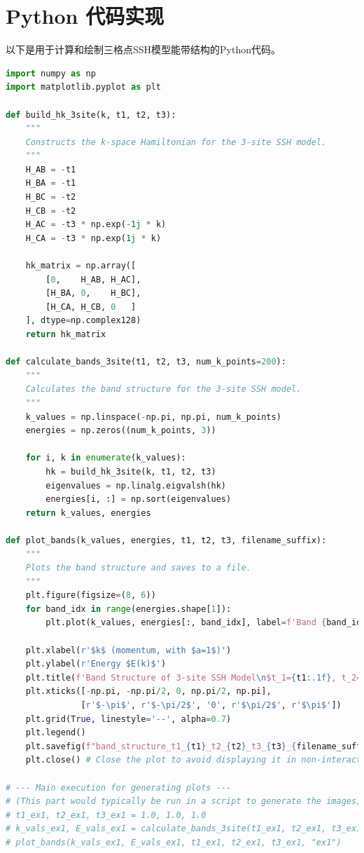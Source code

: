\documentclass[UTF-8]{ctexart}
\begin{document}
\section{Python 代码实现}
以下是用于计算和绘制三格点SSH模型能带结构的Python代码。
\begin{lstlisting}[language=Python, caption=Python代码计算能带结构]
import numpy as np
import matplotlib.pyplot as plt

def build_hk_3site(k, t1, t2, t3):
    """
    Constructs the k-space Hamiltonian for the 3-site SSH model.
    """
    H_AB = -t1
    H_BA = -t1
    H_BC = -t2
    H_CB = -t2
    H_AC = -t3 * np.exp(-1j * k)
    H_CA = -t3 * np.exp(1j * k)

    hk_matrix = np.array([
        [0,    H_AB, H_AC],
        [H_BA, 0,    H_BC],
        [H_CA, H_CB, 0   ]
    ], dtype=np.complex128)
    return hk_matrix

def calculate_bands_3site(t1, t2, t3, num_k_points=200):
    """
    Calculates the band structure for the 3-site SSH model.
    """
    k_values = np.linspace(-np.pi, np.pi, num_k_points)
    energies = np.zeros((num_k_points, 3))

    for i, k in enumerate(k_values):
        hk = build_hk_3site(k, t1, t2, t3)
        eigenvalues = np.linalg.eigvalsh(hk)
        energies[i, :] = np.sort(eigenvalues)
    return k_values, energies

def plot_bands(k_values, energies, t1, t2, t3, filename_suffix):
    """
    Plots the band structure and saves to a file.
    """
    plt.figure(figsize=(8, 6))
    for band_idx in range(energies.shape[1]):
        plt.plot(k_values, energies[:, band_idx], label=f'Band {band_idx + 1}')

    plt.xlabel(r'$k$ (momentum, with $a=1$)')
    plt.ylabel(r'Energy $E(k)$')
    plt.title(f'Band Structure of 3-site SSH Model\n$t_1={t1:.1f}, t_2={t2:.1f}, t_3={t3:.1f}$')
    plt.xticks([-np.pi, -np.pi/2, 0, np.pi/2, np.pi],
               [r'$-\pi$', r'$-\pi/2$', '0', r'$\pi/2$', r'$\pi$'])
    plt.grid(True, linestyle='--', alpha=0.7)
    plt.legend()
    plt.savefig(f"band_structure_t1_{t1}_t2_{t2}_t3_{t3}_{filename_suffix}.png")
    plt.close() # Close the plot to avoid displaying it in non-interactive environments

# --- Main execution for generating plots ---
# (This part would typically be run in a script to generate the images)
# t1_ex1, t2_ex1, t3_ex1 = 1.0, 1.0, 1.0
# k_vals_ex1, E_vals_ex1 = calculate_bands_3site(t1_ex1, t2_ex1, t3_ex1)
# plot_bands(k_vals_ex1, E_vals_ex1, t1_ex1, t2_ex1, t3_ex1, "ex1")


\end{lstlisting}
\end{document}
